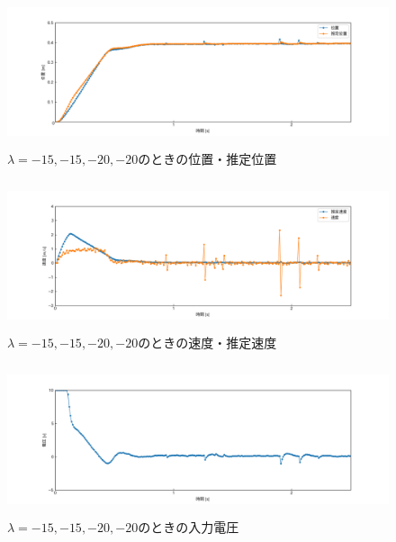 \documentclass[12pt]{jsarticle}
\begin{document}
\begin{figure}[H]
  \begin{center}
    \includegraphics[clip,width=13.0cm, height=4.4cm]{../img/Exp14-1.png}
    \caption{$\lambda=-15, -15, -20, -20$のときの位置・推定位置}
    \label{Exp14-1}
  \end{center}
\end{figure}
\begin{figure}[H]
  \begin{center}
    \includegraphics[clip,width=13.0cm, height=4.4cm]{../img/Exp14-2.png}
    \caption{$\lambda=-15, -15, -20, -20$のときの速度・推定速度}
    \label{Exp14-2}
  \end{center}
\end{figure}
\begin{figure}[H]
  \begin{center}
    \includegraphics[clip,width=13.0cm, height=4.4cm]{../img/Exp14-3.png}
    \caption{$\lambda=-15, -15, -20, -20$のときの入力電圧}
    \label{Exp14-3}
  \end{center}
\end{figure}
\end{document}

